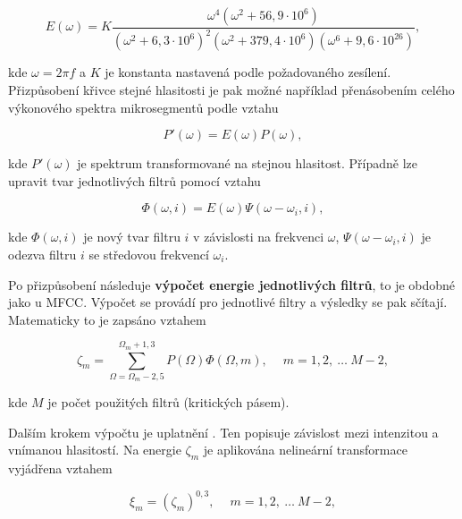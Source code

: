 \begin{equation}
  E\left(\omega\right) = K \frac{\omega^4\left(\omega^2 + 56,9 \cdot 10^6\right)}{\left(\omega^2 + 6,3 \cdot 10^6\right)^2\left(\omega^2 + 379,4 \cdot 10^6\right)\left(\omega^6 + 9,6 \cdot 10^{26}\right)},
  \label{eq:asr:plp:filter}
\end{equation}

\noindent kde $\omega = 2\pi f$ a $K$ je konstanta nastavená podle požadovaného zesílení. Přizpůsobení křivce stejné hlasitosti je pak možné například přenásobením celého výkonového spektra mikrosegmentů podle vztahu

\begin{equation}
  P'\left(\omega\right) = E\left(\omega\right)P\left(\omega\right),
  \label{eq:asr:plp:filter:application1}
\end{equation}

\noindent kde $P'\left(\omega\right)$ je spektrum transformované na stejnou hlasitost. Případně lze upravit tvar jednotlivých filtrů pomocí vztahu

\begin{equation}
  \Phi\left(\omega, i\right) = E\left(\omega\right)\Psi\left(\omega - \omega_i, i\right),
  \label{eq:asr:plp:filter:application2}
\end{equation}

\noindent kde $\Phi\left(\omega, i\right)$ je nový tvar filtru $i$ v závislosti na frekvenci $\omega$, $\Psi\left(\omega - \omega_i, i\right)$ je odezva filtru $i$ se středovou frekvencí $\omega_i$.

Po přizpůsobení následuje \textbf{výpočet energie jednotlivých filtrů}, to je obdobné jako u MFCC. Výpočet se provádí pro jednotlivé filtry a výsledky se pak sčítají. Matematicky to je zapsáno vztahem

\begin{equation}
  \zeta_m = \sum_{\Omega = \Omega_m - 2,5}^{\Omega_m + 1,3} P\left(\Omega\right)\Phi\left(\Omega, m\right), \quad\ m=1, 2,\ \dots\ M - 2,
  \label{eq:asr:plp:energy}
\end{equation}

\noindent kde $M$ je počet použitých filtrů (kritických pásem).

Dalším krokem výpočtu je uplatnění \textbf{}. Ten popisuje závislost mezi intenzitou a vnímanou hlasitostí. Na energie $\zeta_m$ je aplikována nelineární transformace vyjádřena vztahem

\begin{equation}
  \xi_m = \left(\zeta_m\right)^{0,3}, \quad\ m = 1, 2,\ \dots\ M-2,
  \label{eq:asr:plp:energy:transform}
\end{equation}


